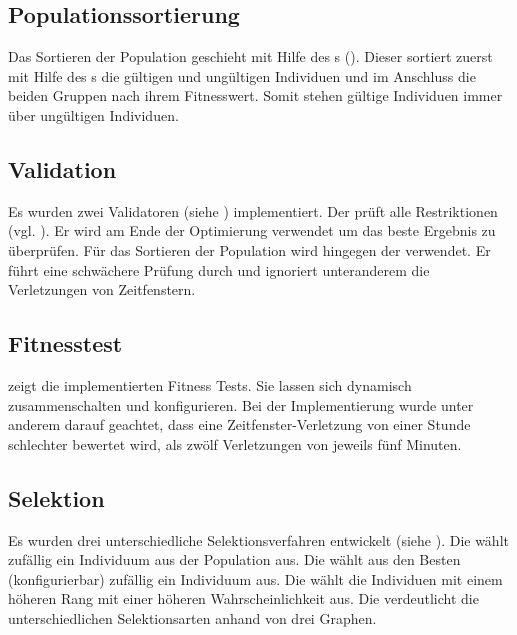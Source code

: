 \newpage
\subsection{Populationssortierung}
Das Sortieren der Population geschieht mit Hilfe des s (). Dieser sortiert zuerst mit Hilfe des s die gültigen und ungültigen Individuen und im Anschluss die beiden Gruppen nach ihrem Fitnesswert. Somit stehen gültige Individuen immer über ungültigen Individuen.

\subsection{Validation}
Es wurden zwei Validatoren (siehe ) implementiert. Der  prüft alle Restriktionen (vgl. ). Er wird am Ende der Optimierung verwendet um das beste Ergebnis zu überprüfen. Für das Sortieren der Population wird hingegen der  verwendet. Er führt eine schwächere Prüfung durch und ignoriert unteranderem die Verletzungen von Zeitfenstern.

\newpage
\subsection{Fitnesstest}
 zeigt die implementierten Fitness Tests. Sie lassen sich dynamisch zusammenschalten und konfigurieren. Bei der Implementierung wurde unter anderem darauf geachtet, dass eine Zeitfenster-Verletzung von einer Stunde schlechter bewertet wird, als zwölf Verletzungen von jeweils fünf Minuten. 

\subsection{Selektion}
Es wurden drei unterschiedliche Selektionsverfahren entwickelt (siehe ). Die  wählt zufällig ein Individuum aus der Population aus. Die  wählt aus den Besten (konfigurierbar) zufällig ein Individuum aus. Die  wählt die Individuen mit einem höheren Rang mit einer höheren Wahrscheinlichkeit aus. Die  verdeutlicht die unterschiedlichen Selektionsarten anhand von drei Graphen.

